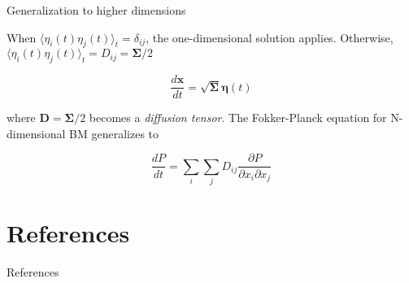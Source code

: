 \documentclass{beamer}					%
\begin{document}
\begin{frame}{Generalization to higher dimensions}

When $\langle \eta_{i}(t)\eta_{j}(t)\rangle_{t} = \delta_{ij}$, the one-dimensional solution applies. Otherwise, $\langle \eta_{i}(t)\eta_{j}(t)\rangle_{t} = D_{ij} = \bm{\Sigma}/2$

\begin{equation*}
\frac{d\bm{x}}{dt} = \sqrt{\bm{\Sigma}}\bm{\eta}(t) 
\end{equation*}

where $\bm{D} = \bm{\Sigma}/2$ becomes a \emph{diffusion tensor}. The Fokker-Planck equation for N-dimensional BM generalizes to 

\begin{equation*}
\frac{dP}{dt} = \sum_{i}\sum_{j}D_{ij}\frac{\partial P}{\partial x_{i}\partial x_{j}}
\end{equation*}

\end{frame}


\section{References}

\begin{frame}[allowframebreaks]{References}
	\tiny
	
\end{frame}
\end{document}
